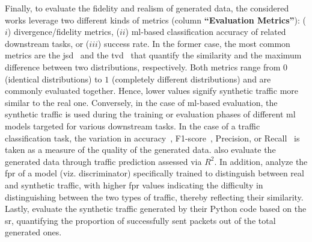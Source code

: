 Finally, to evaluate the fidelity and realism of generated data, the considered works leverage two different kinds of metrics (column \textbf{``Evaluation Metrics''}): ($i$) divergence/fidelity metrics, ($ii$) \gls{ml}-based classification accuracy of related downstream tasks, or ($iii$) success rate.
In the former case, the most common metrics are the \gls{jsd}~\cite{meng2023netgpt, jiang2024netdiffusion, wang2024lens, qu2024trafficgpt, chu2024mamba, zhang2024netdiff, wolf2024} and the \gls{tvd}~\cite{jiang2024netdiffusion, wang2024lens, chu2024mamba, zhang2024netdiff} that quantify the similarity and the maximum difference between two distributions, respectively.
Both metrics range from $0$ (identical distributions) to $1$ (completely different distributions) and are commonly evaluated together. 
Hence, lower values signify synthetic traffic more similar to the real one.
Conversely, in the case of \gls{ml}-based evaluation, the synthetic traffic is used during the training or evaluation phases of different \gls{ml} models targeted for various downstream tasks.
In the case of a traffic classification task, the variation in accuracy~\cite{sivaroopan2023netdiffus, jiang2024netdiffusion, chu2024mamba, zhang2024netdiff, li2024lightweight}, F1-score~\cite{li2024lightweight, wolf2024}, Precision, or Recall~\cite{li2024lightweight} is taken as a measure of the quality of the generated data.
\citet{zhang2024netdiff} also evaluate the generated data through traffic prediction assessed via $R^2$.
In addition, \citet{wolf2024} analyze the \gls{fpr} of a model (viz. discriminator) specifically trained to distinguish between real and synthetic traffic, with higher \gls{fpr} values indicating the difficulty in distinguishing between the two types of traffic, thereby reflecting their similarity.
%
Lastly, \citet{Kholgh2023PACGPT} evaluate the synthetic traffic generated by their Python code based on the \gls{sr}, quantifying the proportion of successfully sent packets out of the total generated ones.

































